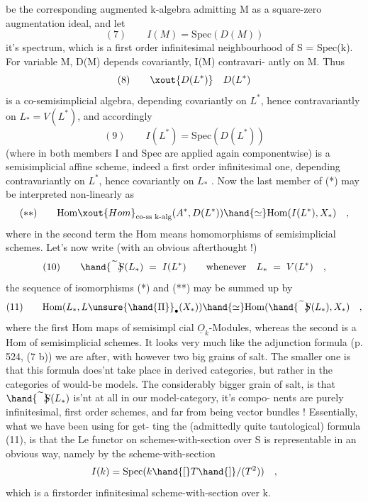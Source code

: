 
be the corresponding augmented k-algebra admitting M as a square-zero
augmentation ideal,  and let
\[ (7) \qquad I(M) = \mathrm{Spec}(D(M)) \]
it's spectrum,  which is a first order infinitesimal neighbourhood of
S = Spec(k).  For variable M,  D(M) depends covariantly, I(M) contravari-%
antly on M.  Thus
\[ (8) \qquad \xout{D(L^*)} \quad D(L^*) \]
is a co-semisimplicial algebra,  depending covariantly on $L^*$,  hence
contravariantly on $L_* = V(L^*)$,  and accordingly
\[ (9) \qquad I(L^*) = \mathrm{Spec}(D(L^*)) \]
(where in both members I and Spec are applied again componentwise) is
a semisimplicial affine scheme,  indeed a first order infinitesimal one,
depending contravariantly on $L^*$,  hence covariantly on $L_*$ .  Now the
last member of (*)  may be interpreted  non-linearly as
\[ (**) \qquad \mathrm{Hom}\xout{Hom}_{\text{co-ss k-alg}}(A^*,D(L^*)) \hand{\simeq} \mathrm{Hom}(I(L^*), X_*) \quad , \]
where in the second term the Hom means homomorphisms of semisimplicial
schemes.  Let's now write (with an obvious afterthought !)
\[ (10) \qquad \hand{\widetilde{\phantom{S}}}\!\!\!S(L_*) \;=\; I(L^*) \qquad \text{whenever} \quad L_* \;=\; V(L^*) \quad , \]
the sequence of isomorphisms (*) and (**) may be summed up by
\[ (11) \qquad \mathrm{Hom}(L_*,L\unsure{\hand{\Pi}}_\bullet(X_*)) \hand{\simeq} \mathrm{Hom}(\hand{\widetilde{\phantom{S}}}\!\!\!S(L_*), X_*) \quad , \]
where the first Hom    maps of semisimpl%
\hand{-}cial $\underline{O}_k$-Modules,  whereas the second is a Hom of semisimplicial schemes.
It looks very much like the adjunction formula (p. 524,  (7 b)) we are
after,  with however two big grains of salt.  The smaller one is that
this formula does'nt take place in derived categories,  but rather in
the categories of would-be models.  The considerably bigger grain of
salt,  is that  $\hand{\widetilde{\phantom{S}}}\!\!\!S(L_*)$  is'nt at all in our model-category,  it's compo-%
nents are purely infinitesimal,  first order schemes,  and far from
being vector bundles !  Essentially,  what we have been using for get-%
ting the (admittedly quite tautological)   formula (11),  is
that the Le functor on schemes-with-section  over S is representable
in an obvious way,  namely by the scheme-with-section
\[ I(k) = \mathrm{Spec}(k\hand{[}T\hand{]}/(T^2)) \quad , \]
which is a first\unsure{\hand{-}}order infinitesimal scheme-with-section over k.

